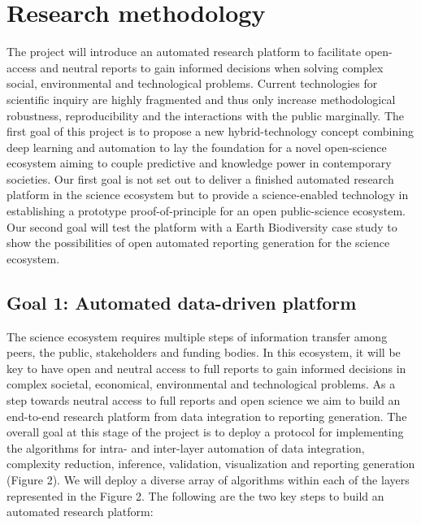 \documentclass[authoryear,1p,12pt]{elsarticle}
\begin{document}
   \section{Research methodology}

   The project will introduce an automated research platform to
   facilitate open-access and neutral reports to gain informed
   decisions when solving complex social, environmental and
   technological problems. Current technologies for scientific inquiry
   are highly fragmented and thus only increase methodological
   robustness, reproducibility and the interactions with the public
   marginally. The first goal of this project is to propose a new
   hybrid-technology concept combining deep learning and automation to
   lay the foundation for a novel open-science ecosystem aiming to
   couple predictive and knowledge power in contemporary
   societies. Our first goal is not set out to deliver a finished
   automated research platform in the science ecosystem but to provide
   a science-enabled technology in establishing a prototype
   proof-of-principle for an open public-science ecosystem. Our second
   goal will test the platform with a Earth Biodiversity case study to
   show the possibilities of open automated reporting generation for
   the science ecosystem.

     \subsection{Goal 1: Automated data-driven platform}

     The science ecosystem requires multiple steps of information
     transfer among peers, the public, stakeholders and funding
     bodies. In this ecosystem, it will be key to have open and
     neutral access to full reports to gain informed decisions in
     complex societal, economical, environmental and technological
     problems. As a step towards neutral access to full reports and
     open science we aim to build an end-to-end research platform from
     data integration to reporting generation. The overall goal at
     this stage of the project is to deploy a protocol for
     implementing the algorithms for intra- and inter-layer automation
     of data integration, complexity reduction, inference, validation,
     visualization and reporting generation (Figure 2). We will deploy
     a diverse array of algorithms within each of the layers
     represented in the Figure 2. The following are the two key steps
     to build an automated research platform:
\end{document}

